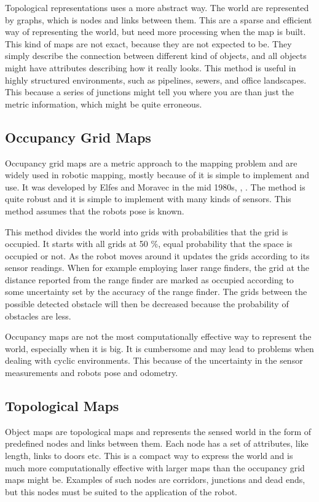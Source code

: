 Topological representations uses a more abstract way. The world are represented by graphs,
which is nodes and links between them. This are a sparse and efficient way of representing
the world, but need more processing when the map is built. This kind of maps are not
exact, because they are not expected to be. They simply describe the connection between
different kind of objects, and all objects might have attributes describing how it really
looks. This method is useful in highly structured environments, such as pipelines, sewers,
and office landscapes. This because a series of junctions might tell you where you are
than just the metric information, which might be quite erroneous. 


\subsection{Occupancy Grid Maps}
Occupancy grid maps are a metric approach to the mapping problem and are widely used in 
robotic mapping, mostly because of it is simple to implement and use. It was developed 
by Elfes and Moravec in the mid 1980s, \cite{elfes}, \cite{moravec}. The method is quite 
robust and it is simple to implement with many kinds of sensors. This method assumes that 
the robots pose is known.

This method divides the world into grids with probabilities that the grid is occupied. It
starts with all grids at 50 \%, equal probability that the space is occupied or not. As
the robot moves around it updates the grids according to its sensor readings. When for
example employing laser range finders, the grid at the distance reported from the range
finder are marked as occupied according to some uncertainty set by the accuracy of the
range finder. The grids between the possible detected obstacle will then be decreased
because the probability of obstacles are less. 

Occupancy maps are not the most computationally effective way to represent the world,
especially when it is big. It is cumbersome and may lead to problems when dealing with
cyclic environments. This because of the uncertainty in the sensor measurements and robots
pose and odometry. 


\subsection{Topological Maps}
Object maps are topological maps and represents the sensed world in the form of predefined nodes and links
between them. Each node has a set of attributes, like length, links to doors etc. This is
a compact way to express the world and is much more computationally effective with larger
maps than the occupancy grid maps might be. Examples of such nodes are corridors,
junctions and dead ends, but this nodes must be suited to the application of the robot. 


